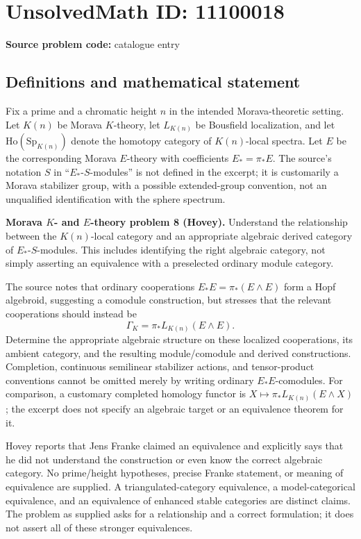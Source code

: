 \documentclass[11pt]{article}
\begin{document}
\section*{UnsolvedMath ID: 11100018}
\textbf{Source problem code:} catalogue entry
\subsection{Definitions and mathematical statement}
Fix a prime and a chromatic height $n$ in the intended Morava-theoretic setting. Let $K(n)$ be Morava $K$-theory, let $L_{K(n)}$ be Bousfield localization, and let $\mathrm{Ho}(\mathrm{Sp}_{K(n)})$ denote the homotopy category of $K(n)$-local spectra. Let $E$ be the corresponding Morava $E$-theory with coefficients $E_*=\pi_*E$. The source's notation $S$ in ``$E_*$-$S$-modules'' is not defined in the excerpt; it is customarily a Morava stabilizer group, with a possible extended-group convention, not an unqualified identification with the sphere spectrum.

\textbf{Morava $K$- and $E$-theory problem 8 (Hovey).} Understand the relationship between the $K(n)$-local category and an appropriate algebraic derived category of $E_*$-$S$-modules. This includes identifying the right algebraic category, not simply asserting an equivalence with a preselected ordinary module category.

The source notes that ordinary cooperations $E_*E=\pi_*(E\wedge E)$ form a Hopf algebroid, suggesting a comodule construction, but stresses that the relevant cooperations should instead be
\[
 \Gamma_K=\pi_*L_{K(n)}(E\wedge E).
\]
Determine the appropriate algebraic structure on these localized cooperations, its ambient category, and the resulting module/comodule and derived constructions. Completion, continuous semilinear stabilizer actions, and tensor-product conventions cannot be omitted merely by writing ordinary $E_*E$-comodules. For comparison, a customary completed homology functor is $X\mapsto\pi_*L_{K(n)}(E\wedge X)$; the excerpt does not specify an algebraic target or an equivalence theorem for it.

Hovey reports that Jens Franke claimed an equivalence and explicitly says that he did not understand the construction or even know the correct algebraic category. No prime/height hypotheses, precise Franke statement, or meaning of equivalence are supplied. A triangulated-category equivalence, a model-categorical equivalence, and an equivalence of enhanced stable categories are distinct claims. The problem as supplied asks for a relationship and a correct formulation; it does not assert all of these stronger equivalences.
\end{document}
